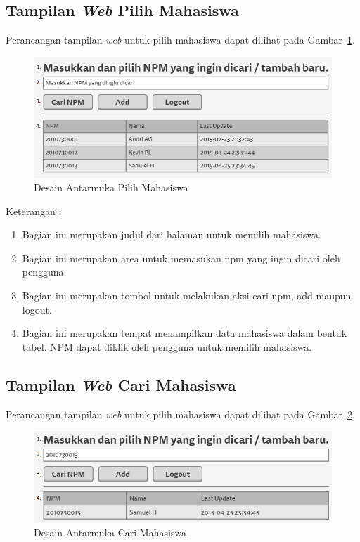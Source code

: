 \subsection{Tampilan {\it Web} Pilih Mahasiswa}
Perancangan tampilan {\it web} untuk pilih mahasiswa dapat dilihat pada
Gambar~\ref{fig:pilihmahasiswa}.

\begin{figure}[ht]
\centering
\includegraphics[scale=0.8]{Gambar/pilihmahasiswa.png}
\caption[Desain Antarmuka Pilih Mahasiswa]{Desain Antarmuka Pilih Mahasiswa}
\label{fig:pilihmahasiswa}
\end{figure}

Keterangan :
\begin{enumerate}[(1)]
\item
Bagian ini merupakan judul dari halaman untuk memilih mahasiswa.
\item
Bagian ini merupakan area untuk memasukan npm yang ingin dicari oleh pengguna.
\item
Bagian ini merupakan tombol untuk melakukan aksi cari npm, add maupun logout.
\item
Bagian ini merupakan tempat menampilkan data mahasiswa dalam bentuk tabel. NPM dapat diklik oleh pengguna untuk memilih mahasiswa.
\end{enumerate}

\subsection{Tampilan {\it Web} Cari Mahasiswa}
Perancangan tampilan {\it web} untuk pilih mahasiswa dapat dilihat pada
Gambar~\ref{fig:carimahasiswa}.

\begin{figure}[ht]
\centering
\includegraphics[scale=0.8]{Gambar/carimahasiswa.png}
\caption[Desain Antarmuka Cari Mahasiswa]{Desain Antarmuka Cari Mahasiswa}
\label{fig:carimahasiswa}
\end{figure}

